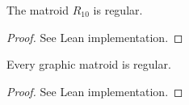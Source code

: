 \begin{theorem}
    \label{matroidR10.isRegular}
    \leanok
    The matroid $R_{10}$ is regular.
\end{theorem}

\begin{proof}
    See Lean implementation.
\end{proof}

\begin{theorem}
    \label{Matroid.IsGraphic.isRegular}
    \leanok
    Every graphic matroid is regular.
\end{theorem}

\begin{proof}
    See Lean implementation.
\end{proof}
